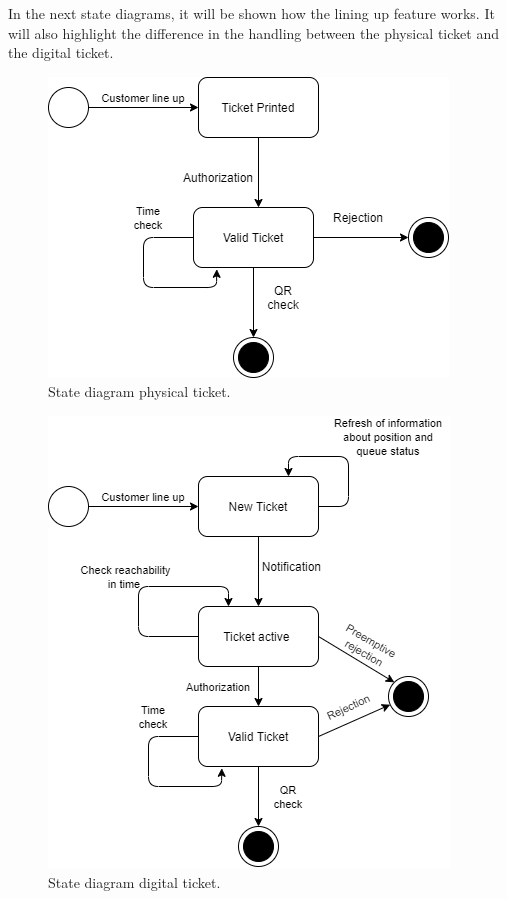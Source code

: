 In the next state diagrams, it will be shown how the lining up feature works. It will also highlight the difference in the handling between the physical ticket and the digital ticket.


\begin{figure}[H]
	\centering
	\includegraphics[scale = 0.5]{images/TicketPhysical.png}
	\caption{State diagram physical ticket.}
\end{figure}


\begin{figure}[H]
	\centering
	\includegraphics[scale = 0.5]{images/statechart.png}
	\caption{State diagram digital ticket.}
\end{figure}

